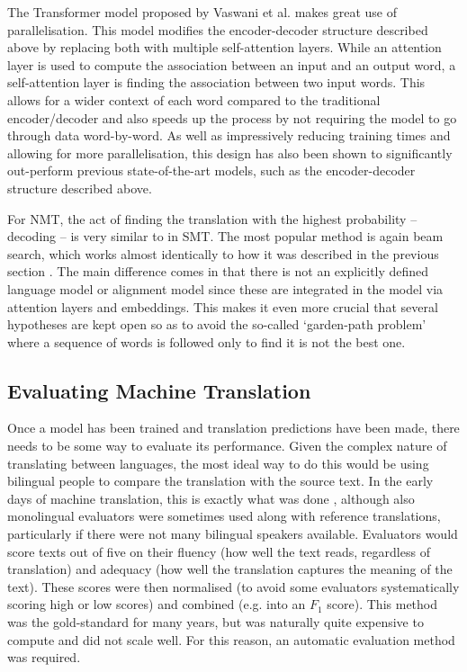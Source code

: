 \documentclass[11pt]{article}
\begin{document}
The Transformer model proposed by Vaswani et al. \citeyearpar{vaswani2017attention} makes great use of parallelisation. This model modifies the encoder-decoder structure described above by replacing both with multiple self-attention layers. While an attention layer is used to compute the association between an input and an output word, a self-attention layer is finding the association between two input words. This allows for a wider context of each word compared to the traditional encoder/decoder and also speeds up the process by not requiring the model to go through data word-by-word. As well as impressively reducing training times and allowing for more parallelisation, this design has also been shown to significantly out-perform previous state-of-the-art models, such as the encoder-decoder structure described above.

\bigskip

For NMT, the act of finding the translation with the highest probability -- decoding -- is very similar to in SMT. The most popular method is again beam search, which works almost identically to how it was described in the previous section \citep[ch. 9]{koehn2020}. The main difference comes in that there is not an explicitly defined language model or alignment model since these are integrated in the model via attention layers and embeddings. This makes it even more crucial that several hypotheses are kept open so as to avoid the so-called ‘garden-path problem’ where a sequence of words is followed only to find it is not the best one.

\subsection{Evaluating Machine Translation}

Once a model has been trained and translation predictions have been made, there needs to be some way to evaluate its performance. Given the complex nature of translating between languages, the most ideal way to do this would be using bilingual people to compare the translation with the source text. In the early days of machine translation, this is exactly what was done \citep{white-etal-1994-arpa}, although also monolingual evaluators were sometimes used along with reference translations, particularly if there were not many bilingual speakers available. Evaluators would score texts out of five on their fluency (how well the text reads, regardless of translation) and adequacy (how well the translation captures the meaning of the text). These scores were then normalised (to avoid some evaluators systematically scoring high or low scores) and combined (e.g. into an $F_1$ score). This method was the gold-standard for many years, but was naturally quite expensive to compute and did not scale well. For this reason, an automatic evaluation method was required.
\end{document}
